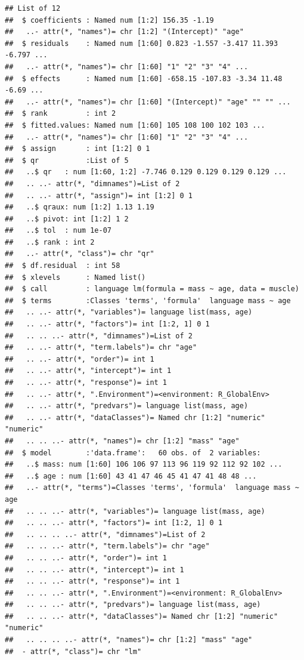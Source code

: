 \documentclass[
]{book}
\begin{document}
\begin{verbatim}
## List of 12
##  $ coefficients : Named num [1:2] 156.35 -1.19
##   ..- attr(*, "names")= chr [1:2] "(Intercept)" "age"
##  $ residuals    : Named num [1:60] 0.823 -1.557 -3.417 11.393 -6.797 ...
##   ..- attr(*, "names")= chr [1:60] "1" "2" "3" "4" ...
##  $ effects      : Named num [1:60] -658.15 -107.83 -3.34 11.48 -6.69 ...
##   ..- attr(*, "names")= chr [1:60] "(Intercept)" "age" "" "" ...
##  $ rank         : int 2
##  $ fitted.values: Named num [1:60] 105 108 100 102 103 ...
##   ..- attr(*, "names")= chr [1:60] "1" "2" "3" "4" ...
##  $ assign       : int [1:2] 0 1
##  $ qr           :List of 5
##   ..$ qr   : num [1:60, 1:2] -7.746 0.129 0.129 0.129 0.129 ...
##   .. ..- attr(*, "dimnames")=List of 2
##   .. ..- attr(*, "assign")= int [1:2] 0 1
##   ..$ qraux: num [1:2] 1.13 1.19
##   ..$ pivot: int [1:2] 1 2
##   ..$ tol  : num 1e-07
##   ..$ rank : int 2
##   ..- attr(*, "class")= chr "qr"
##  $ df.residual  : int 58
##  $ xlevels      : Named list()
##  $ call         : language lm(formula = mass ~ age, data = muscle)
##  $ terms        :Classes 'terms', 'formula'  language mass ~ age
##   .. ..- attr(*, "variables")= language list(mass, age)
##   .. ..- attr(*, "factors")= int [1:2, 1] 0 1
##   .. .. ..- attr(*, "dimnames")=List of 2
##   .. ..- attr(*, "term.labels")= chr "age"
##   .. ..- attr(*, "order")= int 1
##   .. ..- attr(*, "intercept")= int 1
##   .. ..- attr(*, "response")= int 1
##   .. ..- attr(*, ".Environment")=<environment: R_GlobalEnv> 
##   .. ..- attr(*, "predvars")= language list(mass, age)
##   .. ..- attr(*, "dataClasses")= Named chr [1:2] "numeric" "numeric"
##   .. .. ..- attr(*, "names")= chr [1:2] "mass" "age"
##  $ model        :'data.frame':   60 obs. of  2 variables:
##   ..$ mass: num [1:60] 106 106 97 113 96 119 92 112 92 102 ...
##   ..$ age : num [1:60] 43 41 47 46 45 41 47 41 48 48 ...
##   ..- attr(*, "terms")=Classes 'terms', 'formula'  language mass ~ age
##   .. .. ..- attr(*, "variables")= language list(mass, age)
##   .. .. ..- attr(*, "factors")= int [1:2, 1] 0 1
##   .. .. .. ..- attr(*, "dimnames")=List of 2
##   .. .. ..- attr(*, "term.labels")= chr "age"
##   .. .. ..- attr(*, "order")= int 1
##   .. .. ..- attr(*, "intercept")= int 1
##   .. .. ..- attr(*, "response")= int 1
##   .. .. ..- attr(*, ".Environment")=<environment: R_GlobalEnv> 
##   .. .. ..- attr(*, "predvars")= language list(mass, age)
##   .. .. ..- attr(*, "dataClasses")= Named chr [1:2] "numeric" "numeric"
##   .. .. .. ..- attr(*, "names")= chr [1:2] "mass" "age"
##  - attr(*, "class")= chr "lm"
\end{verbatim}
\end{document}
